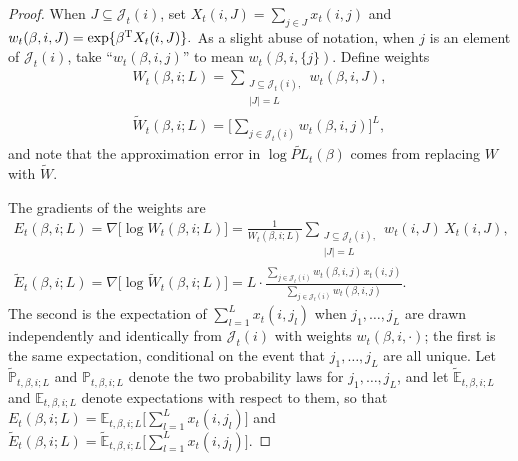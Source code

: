 \documentclass[final]{statsoc}
\begin{document}
\begin{proof}

When $J \subseteq \mathcal{J}_t(i)$, set
\(
    X_t(i, J) = \sum_{j \in J} x_t(i,j)
\)
and
\(
    w_t(\beta, i, J)
        = \exp\{ \beta^{\mathrm{T}} X_t(i,J) \}.
\)
As a slight abuse of notation, when $j$ is an element of $\mathcal{J}_t(i)$,
take ``$w_t(\beta, i, j)$'' to mean $w_t(\beta, i, \{j\})$.  Define weights
\begin{subequations}
\begin{gather*}
    W_t(\beta, i; L)
        = \sum_{\substack{J \subseteq \mathcal{J}_t(i), \\
                          |J| = L}}
              w_t(\beta,i,J), \\
    \widetilde W_t(\beta, i; L)
        =
            \Big[ \sum_{j \in \mathcal{J}_t(i)} w_t(\beta, i, j) \Big]^L,
\end{gather*}
\end{subequations}
and note that the approximation error in
$\log \widetilde{\mathit{PL}}_t(\beta)$ comes from replacing
$W$ with $\widetilde W$.

The gradients of the weights are
\begin{subequations}
\begin{gather*}
    E_t(\beta, i; L)
        = \nabla \big[ \log W_t(\beta, i; L) \big]
        =
        \frac{1}{W_t(\beta, i; L)}
        \sum_{\substack{J \subseteq \mathcal{J}_t(i), \\
                        |J| = L}}\!
            w_t(i,J)
            \,
            X_t(i,J), \\
    \widetilde E_t(\beta, i; L)
        = \nabla \big[ \log \widetilde W_t(\beta, i; L) \big]
        =
        L
        \cdot
        \frac{
            \sum_{j \in \mathcal{J}_t(i)}
                w_t(\beta, i, j) \, x_t(i,j)
        }{
            \sum_{j \in \mathcal{J}_t(i)}
                w_t(\beta, i, j)
        }.
\end{gather*}
\end{subequations}
The second is the expectation of $\sum_{l = 1}^L x_t(i, j_l)$ when
$j_1, \ldots, j_L$ are drawn independently and identically from
$\mathcal{J}_t(i)$ with weights $w_t(\beta, i, \cdot)$; the first is the same
expectation, conditional on the event that $j_1, \ldots, j_L$ are all unique.
Let $\tilde{\mathbb{P}}_{t,\beta,i;L}$ and $\mathbb{P}_{t,\beta,i;L}$
denote the two probability laws for $j_1, \ldots, j_L$, and let
$\tilde{\mathbb{E}}_{t,\beta,i;L}$ and $\mathbb{E}_{t,\beta,i;L}$ denote
expectations with respect to them, so that
\(
    E_t(\beta,i;L)
        =
        \mathbb{E}_{t,\beta,i;L} \big[ \sum_{l=1}^L x_t(i,j_l)\big]
\)
and
\(
    \widetilde E_t(\beta,i;L)
    =
    \tilde{\mathbb{E}}_{t,\beta,i;L} \big[ \sum_{l=1}^L x_t(i,j_l)\big].
\)


\end{proof}
\end{document}
